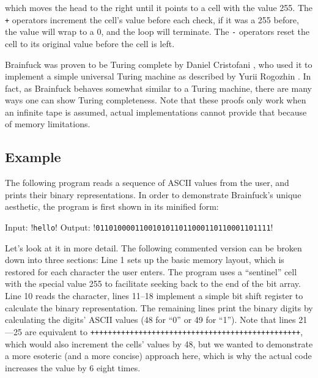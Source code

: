which moves the head to the right until it points to a cell with the value 255. The \texttt{+} operators increment the cell's value before each check, if it was a 255 before, the value will wrap to a 0, and the loop will terminate. The \texttt{-} operators reset the cell to its original value before the cell is left.

Brainfuck was proven to be Turing complete by Daniel Cristofani \cite{cristofani-universal}, who used it to implement a simple universal Turing machine as described by Yurii Rogozhin \cite{rogozhin1996small}. In fact, as Brainfuck behaves somewhat similar to a Turing machine, there are many ways one can show Turing completeness. Note that these proofs only work when an infinite tape is assumed, actual implementations cannot provide that because of memory limitations.

\subsection{Example}

The following program reads a sequence of ASCII values from the user, and prints their binary representations. In order to demonstrate Brainfuck's unique aesthetic, the program is first shown in its minified form:



\begin{io}
Input: !\texttt{hello}!
Output: !\texttt{0110100001100101011011000110110001101111}!
\end{io}

Let's look at it in more detail. The following commented version can be broken down into three sections: Line 1 sets up the basic memory layout, which is restored for each character the user enters. The program uses a “sentinel” cell with the special value 255 to facilitate seeking back to the end of the bit array. Line 10 reads the character, lines 11--18 implement a simple bit shift register to calculate the binary representation. The remaining lines print the binary digits by calculating the digits' ASCII values (48 for “0” or 49 for “1”). Note that lines 21---25 are equivalent to \texttt{++++++++++++++++++++++++++++++++++++++++++++++++}, which would also increment the cells' values by 48, but we wanted to demonstrate a more esoteric (and a more concise) approach here, which is why the actual code increases the value by 6 eight times.



